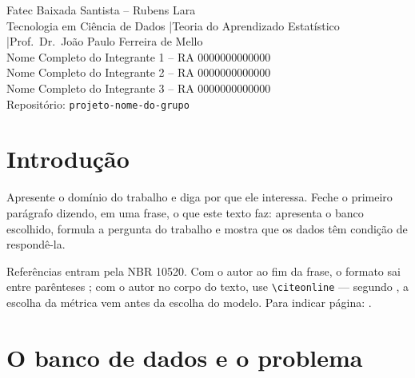 \documentclass[
  article,
  12pt,
  oneside,
  a4paper,
  english,
  brazil
]{abntex2}\usepackage[]{graphicx}\usepackage[]{xcolor}
\newcommand{\nomecurso}{Tecnologia em Ciência de Dados}
\newcommand{\nomedisciplina}{Teoria do Aprendizado Estatístico}
\newcommand{\nomeprofessor}{Prof.\ Dr.\ João Paulo Ferreira de Mello}
\newcommand{\repositorio}{projeto-nome-do-grupo}
\newcommand{\integrantes}{%
  Nome Completo do Integrante 1 -- RA 0000000000000 \\
  Nome Completo do Integrante 2 -- RA 0000000000000 \\
  Nome Completo do Integrante 3 -- RA 0000000000000%
}
\begin{document}
\frenchspacing

\maketitle

\begin{center}
  \small
  Fatec Baixada Santista -- Rubens Lara \\
  \nomecurso{} \quad|\quad \nomedisciplina{} \quad|\quad \nomeprofessor{} \\[0.4em]
  \integrantes \\[0.4em]
  Repositório: \texttt{\repositorio}
\end{center}

\textual

\section{Introdução}

Apresente o domínio do trabalho e diga por que ele interessa. Feche o primeiro
parágrafo dizendo, em uma frase, o que este texto faz: apresenta o banco
escolhido, formula a pergunta do trabalho e mostra que os dados têm condição de
respondê-la.

Referências entram pela NBR 10520. Com o autor ao fim da frase, o formato sai
entre parênteses \cite{james2021}; com o autor no corpo do texto, use
\verb|\citeonline| --- segundo , a escolha da métrica vem
antes da escolha do modelo. Para indicar página: \cite[p.~23]{james2021}.

\section{O banco de dados e o problema}
\end{document}
